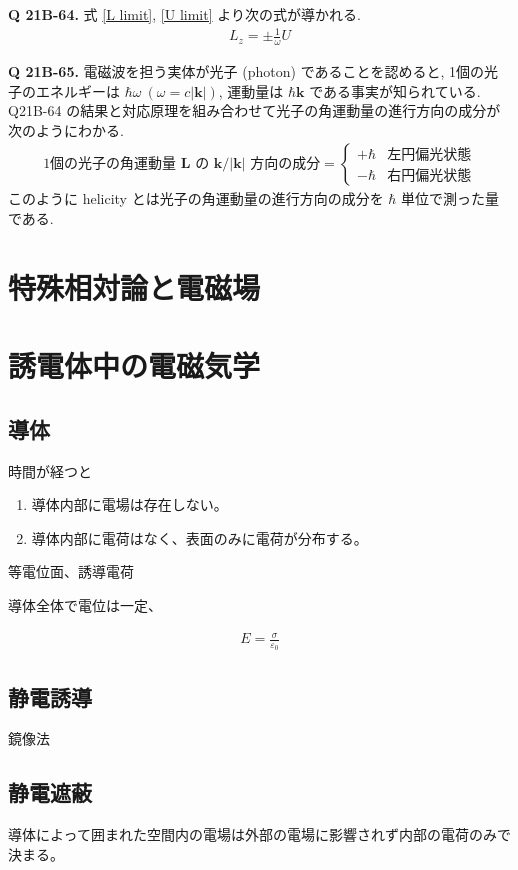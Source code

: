 \documentclass[uplatex,dvipdfmx,a4paper,11pt]{jlreq}
\newcommand{\kk}{\bm{k}}
\newcommand{\LL}{\bm{L}}
\theoremstyle{definition}
\begin{document}
\textbf{Q 21B-64.}
式 \eqref{L limit}, \eqref{U limit} より次の式が導かれる.
\begin{align}
  L_z = \pm\frac{1}{\omega}U
\end{align}

\textbf{Q 21B-65.}
電磁波を担う実体が光子 (photon) であることを認めると, 1個の光子のエネルギーは $\hbar\omega\ (\omega = c|\kk|)$, 運動量は $\hbar\kk$ である事実が知られている. Q21B-64 の結果と対応原理を組み合わせて光子の角運動量の進行方向の成分が次のようにわかる.
\begin{align}
  \textrm{1個の光子の角運動量 $\LL$ の $\kk/|\kk|$ 方向の成分} =
  \begin{cases}
    +\hbar & 左円偏光状態 \\
    -\hbar & 右円偏光状態
  \end{cases}
\end{align}
このように helicity とは光子の角運動量の進行方向の成分を $\hbar$ 単位で測った量である.

\section{特殊相対論と電磁場}


\section{誘電体中の電磁気学}
\subsection{導体}
\begin{definition}[導体]
  時間が経つと
  \begin{enumerate}
    \item 導体内部に電場は存在しない。
    \item 導体内部に電荷はなく、表面のみに電荷が分布する。
  \end{enumerate}
  等電位面、誘導電荷
\end{definition}
導体全体で電位は一定、

\begin{theorem}
  \begin{align}
    E = \frac{\sigma}{\varepsilon_0}
  \end{align}
\end{theorem}
\subsection{静電誘導}
\begin{proposition}[半無限導体と点電荷]
  鏡像法
\end{proposition}

\begin{proposition}[一様外部電場中の導体球]
\end{proposition}

\subsection{静電遮蔽}
導体によって囲まれた空間内の電場は外部の電場に影響されず内部の電荷のみで決まる。
\end{document}
